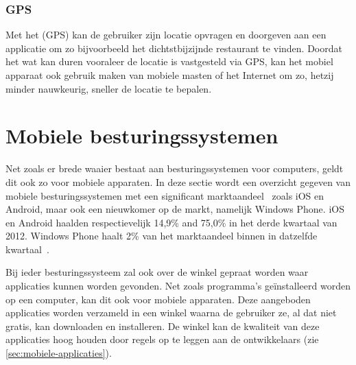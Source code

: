 \subsubsection{GPS}
Met het  (GPS) kan de gebruiker zijn locatie opvragen en doorgeven aan een applicatie om zo bijvoorbeeld het dichtstbijzijnde restaurant te vinden. 
Doordat het wat kan duren vooraleer de locatie is vastgesteld via GPS, kan het mobiel apparaat ook gebruik maken van mobiele masten of het Internet om zo, hetzij minder nauwkeurig, sneller de locatie te bepalen.


\section{Mobiele besturingssystemen}
\label{sec:mobiele-besturingssystemen}
Net zoals er brede waaier bestaat aan besturingssystemen voor computers, geldt dit ook zo voor mobiele apparaten. 
In deze sectie wordt een overzicht gegeven van mobiele besturingssystemen met een significant marktaandeel~\cite{David2011, Hales2012} zoals iOS en Android, maar ook een nieuwkomer op de markt, namelijk Windows Phone.
iOS en Android haalden respectievelijk 14,9\% and 75,0\% in het derde kwartaal van 2012.
Windows Phone haalt 2\% van het marktaandeel binnen in datzelfde kwartaal~\cite{Protalinski2012}.

Bij ieder besturingssysteem zal ook over de winkel gepraat worden waar applicaties kunnen worden gevonden.
Net zoals programma's geïnstalleerd worden op een computer, kan dit ook voor mobiele apparaten.
Deze aangeboden applicaties worden verzameld in een winkel waarna de gebruiker ze, al dat niet gratis, kan downloaden en installeren.
De winkel kan de kwaliteit van deze applicaties hoog houden door regels op te leggen aan de ontwikkelaars (zie \ref{sec:mobiele-applicaties}).

